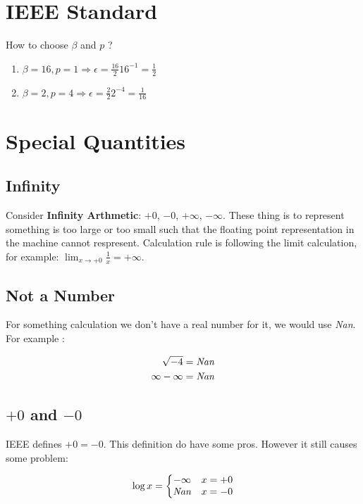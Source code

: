 \section{IEEE Standard}

How to choose $\beta$ and $p$ ?

\begin{enumerate}
    \item $\beta = 16, p = 1 \Rightarrow \epsilon = \frac{16}{2}16^{-1} = \frac{1}{2}$ 
    \item $\beta = 2, p = 4 \Rightarrow \epsilon = \frac{2}{2}2^{-4} = \frac{1}{16}$ 
\end{enumerate}

\section{Special Quantities}

\subsection{Infinity}

Consider \textbf{Infinity Arthmetic}: $+0$, $-0$, $+\infty$, $-\infty$.
These thing is to represent something is too large or too small such that
the floating point representation in the machine cannot respresent.
Calculation rule is following the limit calculation, for example:
$\lim_{x \rightarrow +0} \frac{1}{x} = +\infty$.

\subsection{Not a Number}
For something calculation we don't have a real number for it, we would use {\it Nan}.
For example :

\begin{align}
    \sqrt{-4} &= \it{Nan}       \nonumber \\
    \infty - \infty &= \it{Nan} \nonumber
\end{align}

\subsection{$+0$ and $-0$}

IEEE defines $+0 = -0$. This definition do have some pros.
However it still causes some problem:

\[
    \log x = 
    \left \{
        \begin{matrix}
            -\infty   & x = +0  \\
            \it{Nan} & x = -0  \\
        \end{matrix}
    \right.
\]


